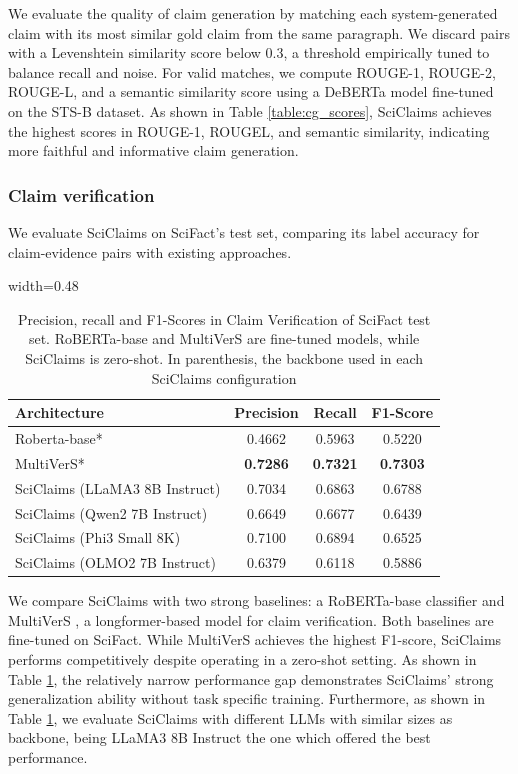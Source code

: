 \documentclass[11pt]{article}
\begin{document}
We evaluate the quality of claim generation by matching each system-generated claim with its most similar gold claim from the same paragraph. We discard pairs with a Levenshtein similarity score below 0.3, a threshold empirically tuned to balance recall and noise. For valid matches, we compute ROUGE-1, ROUGE-2, ROUGE-L, and a semantic similarity score using a DeBERTa model fine-tuned on the STS-B dataset. As shown in Table \ref{table:cg_scores}, SciClaims achieves the highest scores in ROUGE-1, ROUGEL, and semantic similarity, indicating more faithful and informative claim generation.

\subsubsection{Claim verification}
We evaluate SciClaims on SciFact’s test set, comparing its label accuracy for claim-evidence pairs with existing approaches.

\begin{table}[H]
\centering
\begin{adjustbox}{width=0.48\textwidth}
\begin{tabular}{ lccc } 
 \hline
 Architecture & Precision & Recall & F1-Score \\ 
 \hline
 Roberta-base* & 0.4662 & 0.5963 & 0.5220 \\
 MultiVerS* & \textbf{0.7286} & \textbf{0.7321} & \textbf{0.7303} \\ 
 \hline
 SciClaims (LLaMA3 8B Instruct) & 0.7034 & 0.6863 & 0.6788 \\
 SciClaims (Qwen2 7B Instruct) & 0.6649 & 0.6677 & 0.6439\\
 SciClaims (Phi3 Small 8K) & 0.7100 & 0.6894 & 0.6525 \\
 SciClaims (OLMO2 7B Instruct) & 0.6379 & 0.6118 & 0.5886 \\
 \hline
\end{tabular}
\end{adjustbox}
\caption{Precision, recall and F1-Scores in Claim Verification of SciFact test set. RoBERTa-base and MultiVerS are fine-tuned models, while SciClaims is zero-shot. In parenthesis, the backbone used in each SciClaims configuration} 
\label{table:cfc_scores}
\end{table}

 We compare SciClaims with two strong baselines: a RoBERTa-base classifier \cite{liu2019robertarobustlyoptimizedbert} and MultiVerS \cite{wadden2022multiversimprovingscientificclaim}, a longformer-based model for claim verification. Both baselines are fine-tuned on SciFact. While MultiVerS achieves the highest F1-score, SciClaims performs competitively despite operating in a zero-shot setting. As shown in Table \ref{table:cfc_scores}, the relatively narrow performance gap demonstrates SciClaims’ strong generalization ability without task specific training. Furthermore, as shown in Table \ref{table:cfc_scores}, we evaluate SciClaims with different LLMs with similar sizes as backbone, being LLaMA3 8B Instruct the one which offered the best performance.
\end{document}
